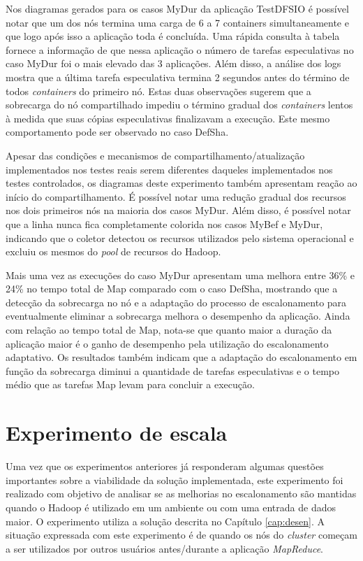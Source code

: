 Nos diagramas gerados para os casos MyDur da aplicação TestDFSIO é possível notar que um dos nós termina uma carga de 6 a 7 containers simultaneamente e que logo após isso a aplicação toda é concluída. Uma rápida consulta à tabela fornece a informação de que nessa aplicação o número de tarefas especulativas no caso MyDur foi o mais elevado das 3 aplicações. Além disso, a análise dos logs mostra que a última tarefa especulativa termina 2 segundos antes do término de todos \textit{containers} do primeiro nó. Estas duas observações sugerem que a sobrecarga do nó compartilhado impediu o término gradual dos \textit{containers} lentos à medida que suas cópias especulativas finalizavam a execução. Este mesmo comportamento pode ser observado no caso DefSha.

Apesar das condições e mecanismos de compartilhamento/atualização implementados nos testes reais serem diferentes daqueles implementados nos testes controlados, os diagramas deste experimento também apresentam reação ao início do compartilhamento. É possível notar uma redução gradual dos recursos nos dois primeiros nós na maioria dos casos MyDur. Além disso, é possível notar que a linha nunca fica completamente colorida nos casos MyBef e MyDur, indicando que o coletor detectou os recursos utilizados pelo sistema operacional e excluiu os mesmos do \textit{pool} de recursos do Hadoop.

Mais uma vez as execuções do caso MyDur apresentam uma melhora entre 36\% e 24\% no tempo total de Map comparado com o caso DefSha, mostrando que a detecção da sobrecarga no nó e a adaptação do processo de escalonamento para eventualmente eliminar a sobrecarga melhora o desempenho da aplicação. Ainda com relação ao tempo total de Map, nota-se que quanto maior a duração da aplicação maior é o ganho de desempenho pela utilização do escalonamento adaptativo. Os resultados também indicam que a adaptação do escalonamento em função da sobrecarga diminui a quantidade de tarefas especulativas e o tempo médio que as tarefas Map levam para concluir a execução. 


\section{Experimento de escala}
Uma vez que os experimentos anteriores já responderam algumas questões importantes sobre a viabilidade da solução implementada, este experimento foi realizado com objetivo de analisar se as melhorias no escalonamento são mantidas quando o Hadoop é utilizado em um ambiente ou com uma entrada de dados maior. O experimento utiliza a solução descrita no Capítulo \ref{cap:desen}. A situação expressada com este experimento é de quando os nós do \textit{cluster} começam a ser utilizados por outros usuários antes/durante a aplicação \textit{MapReduce}.


